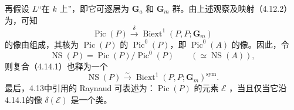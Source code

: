 再假设 $L$“在 $k$ 上”，即它可逐层为 $\mathbf G_a$ 和 $\mathbf G_m$ 群。由上述观察及映射（4.12.2）为，可知
\[
\operatorname{Pic}(P)\xrightarrow{\delta}\operatorname{Biext}^1(P,P;\mathbf G_m)\tag{4.14.2}
\]
的像由组成，其核为 $\operatorname{Pic}(P)$ 的 $\operatorname{Pic}^0(P)$，即 $\operatorname{Pic}^0(A)$ 的像。因此，令
\[\operatorname{NS}(P)=\operatorname{Pic}(P)/\operatorname{Pic}^0(P)\qquad(\simeq\operatorname{NS}(A)),\]
则复合（4.14.1）也释为一个
\[
\operatorname{NS}(P)\xrightarrow{\sim}\operatorname{Biext}^1(P,P;\mathbf G_m)^{\mathrm{sym}}.\tag{4.14.3}
\]
最后，4.13中引用的 Raynaud 可表述为：$\operatorname{Pic}(P)$ 的元素 $\mathscr E$ ，当且仅当它沿4.14.1的像 $\delta(\mathscr E)$ 是一个类。

